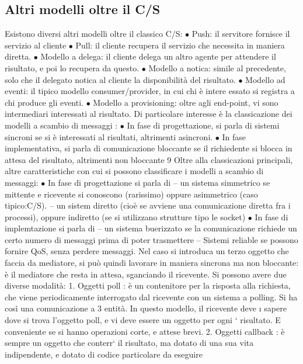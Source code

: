 \subsection{Altri modelli oltre il C/S}
Esistono diversi altri modelli oltre il classico C/S:
$\bullet$ Push: il servitore fornisce il servizio al cliente
$\bullet$ Pull: il cliente recupera il servizio che necessita in maniera diretta.
$\bullet$ Modello a delega: il cliente delega un altro agente per attendere il risultato,
e poi lo recupera da questo.
$\bullet$ Modello a notica: simile al precedente, solo che il delegato notica al
cliente la disponibilità del risultato.
$\bullet$ Modello ad eventi: il tipico modello consumer/provider, in cui chi è intere
essato si registra a chi produce gli eventi.
$\bullet$ Modello a provisioning: oltre agli end-point, vi sono intermediari interessati al risultato.
Di particolare interesse è la classicazione dei modelli a scambio di messaggi :
$\bullet$ In fase di progettazione, si parla di sistemi sincroni se si è interessati al
risultati, altrimenti asincroni.
$\bullet$ In fase implementativa, si parla di comunicazione bloccante se il richiedente
si blocca in attesa del risultato, altrimenti non bloccante
9
Oltre alla classicazioni principali, altre caratteristiche con cui si possono classificare i modelli a scambio di
messaggi:
$\bullet$ In fase di progettazione si parla di
-- un sistema simmetrico se mittente e ricevente si conoscono (rarissimo) oppure asimmetrico (caso tipico:C/S).
-- un sistem diretto (cioè se avviene una comunicazione diretta fra i
processi), oppure indiretto (se si utilizzano strutture tipo le socket)
$\bullet$ In fase di implemtazione si parla di
-- un sistema buerizzato se la comunicazione richiede un certo numero
di messaggi prima di poter trasmettere
-- Sistemi reliable se possono fornire QoS, senza perdere messaggi.
Nel caso si introduca un terzo oggetto che faccia da mediatore, si può quindi
lavorare in maniera sincrona ma non bloccante: è il mediatore che resta in
attesa, sganciando il ricevente. Si possono avere due diverse modalità:
1. Oggetti poll : è un contenitore per la risposta alla richiesta, che viene
periodicamente interrogato dal ricevente con un sistema a polling. Si ha
così una comunicazione a 3 entità. In questo modello, il ricevente deve
\i{}
sapere dove si trova l'oggetto poll, e vi deve essere un oggetto per ogni
`
risultato. E conveniente se si hanno operazioni corte, e attese brevi.
2. Oggetti callback : è sempre un oggetto che conterr` il risultato, ma dotato
di una sua vita indipendente, e dotato di codice particolare da eseguire
